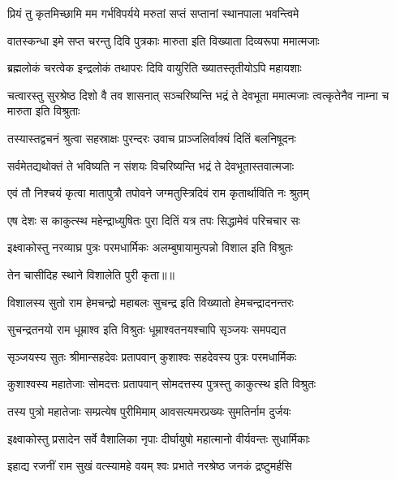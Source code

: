 \twolineshloka
{प्रियं तु कृतमिच्छामि मम गर्भविपर्यये}
{मरुतां सप्तं सप्तानां स्थानपाला भवन्त्विमे} %

\twolineshloka
{वातस्कन्धा इमे सप्त चरन्तु दिवि पुत्रकाः}
{मारुता इति विख्याता दिव्यरूपा ममात्मजाः} %

\twolineshloka
{ब्रह्मलोकं चरत्वेक इन्द्रलोकं तथापरः}
{दिवि वायुरिति ख्यातस्तृतीयोऽपि महायशाः} %

\threelineshloka
{चत्वारस्तु सुरश्रेष्ठ दिशो वै तव शासनात्}
{सञ्चरिष्यन्ति भद्रं ते देवभूता ममात्मजाः}
{त्वत्कृतेनैव नाम्ना च मारुता इति विश्रुताः} %

\twolineshloka
{तस्यास्तद्वचनं श्रुत्वा सहस्राक्षः पुरन्दरः}
{उवाच प्राञ्जलिर्वाक्यं दितिं बलनिषूदनः} %

\twolineshloka
{सर्वमेतद्यथोक्तं ते भविष्यति न संशयः}
{विचरिष्यन्ति भद्रं ते देवभूतास्तवात्मजाः} %

\twolineshloka
{एवं तौ निश्चयं कृत्वा मातापुत्रौ तपोवने}
{जग्मतुस्त्रिदिवं राम कृतार्थाविति नः श्रुतम्} %

\twolineshloka
{एष देशः स काकुत्स्थ महेन्द्राध्युषितः पुरा}
{दितिं यत्र तपः सिद्धामेवं परिचचार सः} %

\twolineshloka
{इक्ष्वाकोस्तु नरव्याघ्र पुत्रः परमधार्मिकः}
{अलम्बुषायामुत्पन्नो विशाल इति विश्रुतः} %

{तेन चासीदिह स्थाने विशालेति पुरी कृता॥॥} %

\addtocounter{shlokacount}{1}

\twolineshloka
{विशालस्य सुतो राम हेमचन्द्रो महाबलः}
{सुचन्द्र इति विख्यातो हेमचन्द्रादनन्तरः} %

\twolineshloka
{सुचन्द्रतनयो राम धूम्राश्व इति विश्रुतः}
{धूम्राश्वतनयश्चापि सृञ्जयः समपद्यत} %

\twolineshloka
{सृञ्जयस्य सुतः श्रीमान्सहदेवः प्रतापवान्}
{कुशाश्वः सहदेवस्य पुत्रः परमधार्मिकः} %

\twolineshloka
{कुशाश्वस्य महातेजाः सोमदत्तः प्रतापवान्}
{सोमदत्तस्य पुत्रस्तु काकुत्स्थ इति विश्रुतः} %

\twolineshloka
{तस्य पुत्रो महातेजाः सम्प्रत्येष पुरीमिमाम्}
{आवसत्यमरप्रख्यः सुमतिर्नाम दुर्जयः} %

\twolineshloka
{इक्ष्वाकोस्तु प्रसादेन सर्वे वैशालिका नृपाः}
{दीर्घायुषो महात्मानो वीर्यवन्तः सुधार्मिकाः} %

\twolineshloka
{इहाद्य रजनीं राम सुखं वत्स्यामहे वयम्}
{श्वः प्रभाते नरश्रेष्ठ जनकं द्रष्टुमर्हसि} %

